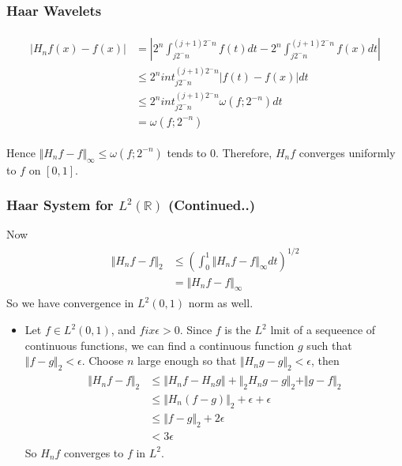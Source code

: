 \documentclass{beamer}
\begin{document}
\begin{frame}
\frametitle{Haar Wavelets}
    \begin{eqnarray*}
        \begin{split}
            |H_nf(x) - f(x)| &= |2^n\int_{j2^-n}^{(j+1)2^-n}f(t)dt-2^n\int_{j2^-n}^{(j+1)2^-n}f(x)dt| \\
            &\le 2^n int_{j2^-n}^{(j+1)2^-n}|f(t) - f(x)|dt \\
            &\le 2^n int_{j2^-n}^{(j+1)2^-n}\omega(f;2^{-n})dt \\
            &= \omega(f;2^{-n})
        \end{split}
    \end{eqnarray*}

    Hence $\Vert H_nf - f \Vert_{\infty} \le \omega(f;2^{-n})$ tends to 0. Therefore, $H_nf$ converges uniformly to $f$ on $[0, 1]$.
\end{frame}


\begin{frame}
    \frametitle{Haar System for  $L^2\left({\mathbb{R}}\right)$ (Continued..)}
    Now
    \begin{eqnarray*}
        \begin{split}
            \Vert H_nf - f \Vert_{2} &\le \left(\int_0^1 \Vert H_nf - f \Vert_{\infty}dt \right)^{1/2}\\
            &= \Vert H_nf - f \Vert_{\infty}
        \end{split}
    \end{eqnarray*}
So we have convergence in $L^2(0,1)$ norm as well.
\begin{itemize}
    \item Let  $f \in L^2(0,1)$, and $fix \epsilon > 0$. Since $f$ is the $L^2$ lmit of a sequeence of 
    continuous functions, we can find a continuous function $g$ such that $\Vert f - g \Vert_2 < \epsilon$. Choose $n$ large enough so that
    $\Vert H_ng - g \Vert_2 < \epsilon$, then
    \begin{eqnarray*}
        \begin{split}
            \Vert H_nf - f \Vert_{2} &\le \Vert H_nf - H_ng \Vert + \Vert_2 H_ng- g \Vert_2  + \Vert g -f \Vert_2 \\
            &\le \Vert H_n(f- g)\Vert_2 + \epsilon + \epsilon \\
            &\le \Vert f- g\Vert_2 +  2\epsilon \\
            &< 3\epsilon
        \end{split}
    \end{eqnarray*}
    So $H_nf$ converges to $f$  in $L^2$.
\end{itemize}
\end{frame}
    
\end{document}
